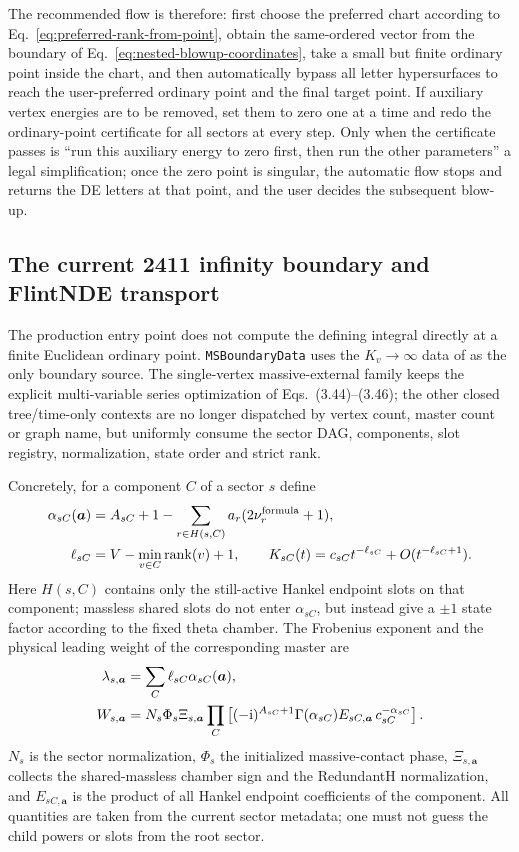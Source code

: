 \documentclass[11pt,a4paper]{article}
\newcommand{\ii}{\mathrm i}
\begin{document}
The recommended flow is therefore: first choose the preferred chart according to Eq.~\eqref{eq:preferred-rank-from-point}, obtain the same-ordered vector from the boundary of Eq.~\eqref{eq:nested-blowup-coordinates}, take a small but finite ordinary point inside the chart, and then automatically bypass all letter hypersurfaces to reach the user-preferred ordinary point and the final target point. If auxiliary vertex energies are to be removed, set them to zero one at a time and redo the ordinary-point certificate for all sectors at every step. Only when the certificate passes is ``run this auxiliary energy to zero first, then run the other parameters'' a legal simplification; once the zero point is singular, the automatic flow stops and returns the DE letters at that point, and the user decides the subsequent blow-up.

\subsection{The current 2411 infinity boundary and FlintNDE transport}

The production entry point does not compute the defining integral directly at a finite Euclidean ordinary point. \texttt{MSBoundaryData} uses the $K_v\to\infty$ data of \cite{Chen:2024jms} as the only boundary source. The single-vertex massive-external family keeps the explicit multi-variable series optimization of Eqs.~(3.44)--(3.46); the other closed tree/time-only contexts are no longer dispatched by vertex count, master count or graph name, but uniformly consume the sector DAG, components, slot registry, normalization, state order and strict rank.

Concretely, for a component $C$ of a sector $s$ define
\begin{align}
 \alpha_{sC}(\bm a)&=A_{sC}+1-
 \sum_{r\in H(s,C)}a_r(2\nu_r^{\rm formula}+1),
 \notag\\
 \ell_{sC}&=V-\min_{v\in C}\operatorname{rank}(v)+1,
 \qquad
 K_{sC}(t)=c_{sC}t^{-\ell_{sC}}+O(t^{-\ell_{sC}+1}).
 \label{eq:generic-sector-boundary-component}
\end{align}
Here $H(s,C)$ contains only the still-active Hankel endpoint slots on that component; massless shared slots do not enter $\alpha_{sC}$, but instead give a $\pm1$ state factor according to the fixed theta chamber. The Frobenius exponent and the physical leading weight of the corresponding master are
\begin{align}
 \lambda_{s,\bm a}&=\sum_C\ell_{sC}\alpha_{sC}(\bm a),
 \notag\\
 W_{s,\bm a}&=N_s\Phi_s\Xi_{s,\bm a}
 \prod_C\left[
 (-\ii)^{A_{sC}+1}\Gamma(\alpha_{sC})
 E_{sC,\bm a}\,c_{sC}^{-\alpha_{sC}}
 \right].
 \label{eq:generic-sector-boundary-weight}
\end{align}
$N_s$ is the sector normalization, $\Phi_s$ the initialized massive-contact phase, $\Xi_{s,\bm a}$ collects the shared-massless chamber sign and the RedundantH normalization, and $E_{sC,\bm a}$ is the product of all Hankel endpoint coefficients of the component. All quantities are taken from the current sector metadata; one must not guess the child powers or slots from the root sector.
\end{document}
